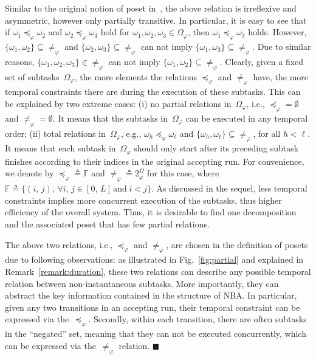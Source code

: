Similar to the original notion of poset in~\cite{simovici2008mathematical},
the above relation is irreflexive and asymmetric,
however only partially transitive.
In particular, it is easy to see that
if $\omega_1\preceq_{\varphi} \omega_2$ and $\omega_2\preceq_{\varphi} \omega_3$
hold for $\omega_1,\omega_2,\omega_3\in \Omega_{\varphi}$,
then $\omega_1\preceq_{\varphi}\omega_3$ holds.
However, $\{\omega_1,\omega_2\}\subseteq\neq_{\varphi} $ and $\{\omega_2,\omega_3\}\subseteq\neq_{\varphi}$
can not imply $\{\omega_1,\omega_3\}\subseteq\neq_{\varphi}$.
Due to similar reasons, $\{\omega_1,\omega_2,\omega_3\}\in\neq_\varphi$ can not imply $\{\omega_1,\omega_2\}\subseteq\neq_{\varphi}$.
Clearly, given a fixed set of subtasks~$\Omega_{\varphi}$, the more elements
the relations $\preceq_{\varphi}$ and $\neq_{\varphi}$ have,
the more temporal constraints there are during the execution of these subtasks.
This can be explained by two extreme cases:
(i) no partial relations in~$\Omega_{\varphi}$, i.e.,
$\preceq_{\varphi}=\emptyset$ and $\neq_{\varphi}=\emptyset$.
It means that the subtasks in~$\Omega_{\varphi}$ can be executed in any temporal order;
(ii) total relations in~$\Omega_{\varphi}$,
e.g., $\omega_h \preceq_{\varphi} \omega_\ell$
and $\{\omega_h, \omega_\ell \}\subseteq\neq_{\varphi} $, for all $h<\ell$.
It means that each subtask in~$\Omega_{\varphi}$ should only start after
its preceding subtask finishes according to their indices in the original accepting run.
For convenience, we denote by $\preceq_{\varphi} \triangleq \mathbb{F}$
and $\neq_{\varphi} \triangleq 2^\Omega_{\varphi}$ for this case,
where $\mathbb{F}\triangleq \{(i,\, j),\, \forall i,\,j\in [0,\, L] \,\text{and}\; i<j\}$.
As discussed in the sequel,
less temporal constraints implies more concurrent execution of the subtasks,
thus higher efficiency of the overall system.
Thus, it is desirable to find one decomposition and the associated poset
that has few partial relations.


\begin{remark}\label{remark:partial-order-motivation}
The above two relations, i.e., $\preceq_\varphi$ and $\neq_\varphi$,
are chosen in the definition of posets due to following observations:
as illustrated in Fig.~\ref{fig:partial} and explained in Remark~\ref{remark:duration},
these two relations can describe any possible temporal relation
between non-instantaneous subtasks.
More importantly,
they can abstract the key information contained in the structure of NBA.
In particular, given any two transitions in an accepting run,
their temporal constraint can be expressed via the~$\preceq_\varphi$.
Secondly, within each transition, there are often subtasks in the ``negated'' set,
meaning that they can not be executed concurrently,
which can be expressed via the~$\neq_\varphi$ relation.
\hfill $\blacksquare$
\end{remark}

